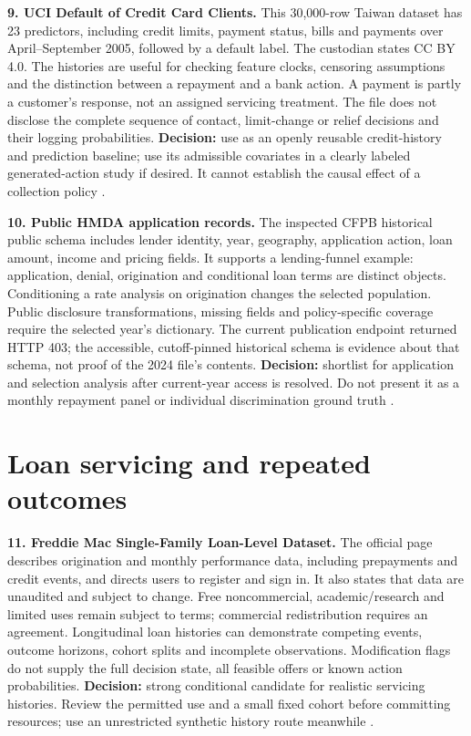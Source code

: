 \textbf{9. UCI Default of Credit Card Clients.} This 30,000-row Taiwan
dataset has 23 predictors, including credit limits, payment status,
bills and payments over April--September 2005, followed by a default
label. The custodian states CC BY 4.0. The histories are useful for
checking feature clocks, censoring assumptions and the distinction
between a repayment and a bank action. A payment is partly a customer's
response, not an assigned servicing treatment. The file does not
disclose the complete sequence of contact, limit-change or relief
decisions and their logging probabilities. \textbf{Decision:} use as an
openly reusable credit-history and prediction baseline; use its
admissible covariates in a clearly labeled generated-action study if
desired. It cannot establish the causal effect of a collection policy
\citep{pd15_uci_credit}.

\textbf{10. Public HMDA application records.} The inspected CFPB
historical public schema includes lender identity, year, geography,
application action, loan amount, income and pricing fields. It supports
a lending-funnel example: application, denial, origination and
conditional loan terms are distinct objects. Conditioning a rate
analysis on origination changes the selected population. Public
disclosure transformations, missing fields and policy-specific coverage
require the selected year's dictionary. The current publication endpoint
returned HTTP 403; the accessible, cutoff-pinned historical schema is
evidence about that schema, not proof of the 2024 file's contents.
\textbf{Decision:} shortlist for application and selection analysis
after current-year access is resolved. Do not present it as a monthly
repayment panel or individual discrimination ground truth
\citep{pd15_hmda_schema}.

\hypertarget{loan-servicing-and-repeated-outcomes}{%
\section{Loan servicing and repeated
outcomes}\label{loan-servicing-and-repeated-outcomes}}

\textbf{11. Freddie Mac Single-Family Loan-Level Dataset.} The official
page describes origination and monthly performance data, including
prepayments and credit events, and directs users to register and sign
in. It also states that data are unaudited and subject to change. Free
noncommercial, academic/research and limited uses remain subject to
terms; commercial redistribution requires an agreement. Longitudinal
loan histories can demonstrate competing events, outcome horizons,
cohort splits and incomplete observations. Modification flags do not
supply the full decision state, all feasible offers or known action
probabilities. \textbf{Decision:} strong conditional candidate for
realistic servicing histories. Review the permitted use and a small
fixed cohort before committing resources; use an unrestricted synthetic
history route meanwhile \citep{pd15_freddie}.

